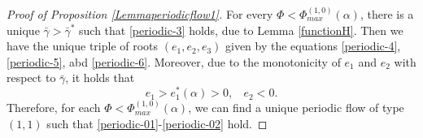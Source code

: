 \documentclass[reqno,12pt]{amsart}
\newtheorem{remark}{Remark}[section]
\newtheorem{pro}[theorem]{Proposition}
\begin{document}
\begin{proof}[Proof of Proposition \ref{Lemmaperiodicflow1}]
For every $\Phi < \Phi_{max}^{(1,0)}(\alpha)$,  there is a unique $ \bar{\gamma} >  \bar{\gamma}^* $ such that \eqref{periodic-3} holds, due to Lemma \ref{functionH}. Then we have the unique triple of roots $(e_1, e_2, e_3)$ given by the equations \eqref{periodic-4}, \eqref{periodic-5}, abd \eqref{periodic-6}.
Moreover, due to the monotonicity  of $e_1$ and $e_2$ with respect to $ \bar{\gamma}$, it holds that 
\begin{equation*}
e_1 > e_1^*(\alpha)>0, \ \ \ \ e_2 <  0. 
\end{equation*}
 Therefore, for each $\Phi < \Phi_{max}^{(1,0)}(\alpha)$, we can find a unique periodic flow of type $(1, 1)$ such that \eqref{periodic-01}-\eqref{periodic-02} hold.







    

\end{proof}
\end{document}
